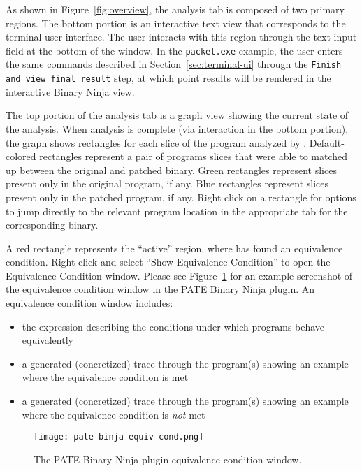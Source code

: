 As shown in Figure~\ref{fig:overview}, the \pate{} analysis tab is composed of two primary regions.
The bottom portion is an interactive text view that corresponds to the terminal user interface.
The user interacts with this region through the text input field at the bottom of the window.
In the \texttt{packet.exe} example, the user enters the same commands described in Section~\ref{sec:terminal-ui} through the \texttt{Finish and view final result} step, at which point results will be rendered in the interactive Binary Ninja view.

The top portion of the \pate{} analysis tab is a graph view showing the current state of the \pate{} analysis.
When \pate{} analysis is complete (via interaction in the bottom portion), the \pate{} graph shows rectangles for each slice of the program analyzed by \pate{}.
Default-colored rectangles represent a pair of programs slices that were able to matched up between the original and patched binary.
Green rectangles represent slices present only in the original program, if any.
Blue rectangles represent slices present only in the patched program, if any.
Right click on a rectangle for options to jump directly to the relevant program location in the appropriate tab for the corresponding binary.

A red rectangle represents the ``active'' region, where \pate{} has found an equivalence condition.
Right click and select ``Show Equivalence Condition'' to open the Equivalence Condition window.
Please see Figure~\ref{fig:equiv-cond} for an example screenshot of the equivalence condition window in the PATE Binary Ninja plugin.
An equivalence condition window includes:

\begin{itemize}
    \item the expression describing the conditions under which programs behave equivalently
    \item a generated (concretized) trace through the program(s) showing an example where the equivalence condition is met
    \item a generated (concretized) trace through the program(s) showing an example where the equivalence condition is \emph{not} met
\end{itemize}

\begin{figure}[h]
  \centering
  \texttt{[image: pate-binja-equiv-cond.png]}
  \caption{The PATE Binary Ninja plugin equivalence condition window.}
  \label{fig:equiv-cond}
\end{figure}

